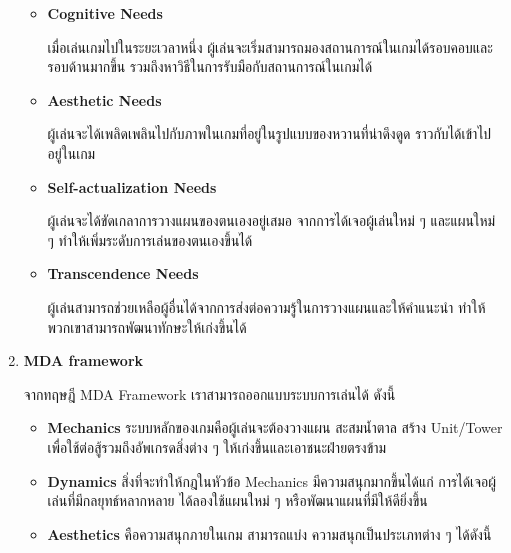 \documentclass[12pt,oneside,openright,a4paper]{cpe-thai-project}
\begin{document}
\begin{enumerate}
\begin{itemize}
    \item \textbf{Cognitive Needs} 
    
    เมื่อเล่นเกมไปในระยะเวลาหนึ่ง ผู้เล่นจะเริ่มสามารถมองสถานการณ์ในเกมได้รอบคอบและรอบด้านมากขึ้น รวมถึงหาวิธีในการรับมือกับสถานการณ์ในเกมได้
    
    \item \textbf{Aesthetic Needs} 
    
    ผู้เล่นจะได้เพลิดเพลินไปกับภาพในเกมที่อยู่ในรูปแบบของหวานที่น่าดึงดูด ราวกับได้เข้าไปอยู่ในเกม
    
    \item \textbf{Self-actualization Needs} 
    
    ผู้เล่นจะได้ขัดเกลาการวางแผนของตนเองอยู่เสมอ จากการได้เจอผู้เล่นใหม่ ๆ และแผนใหม่ ๆ ทำให้เพิ่มระดับการเล่นของตนเองขึ้นได้
    
    \item \textbf{Transcendence Needs} 
    
    ผู้เล่นสามารถช่วยเหลือผู้อื่นได้จากการส่งต่อความรู้ในการวางแผนและให้คำแนะนำ ทำให้พวกเขาสามารถพัฒนาทักษะให้เก่งขึ้นได้
  \end{itemize}


  \item \textbf{MDA framework}
  
  จากทฤษฎี MDA Framework เราสามารถออกแบบระบบการเล่นได้ ดังนี้

  \begin{itemize}
    \item \textbf{Mechanics} ระบบหลักของเกมคือผู้เล่นจะต้องวางแผน 
    สะสมน้ำตาล สร้าง Unit/Tower เพื่อใช้ต่อสู้รวมถึงอัพเกรดสิ่งต่าง ๆ 
    ให้เก่งขึ้นและเอาชนะฝ่ายตรงข้าม
    \item \textbf{Dynamics} สิ่งที่จะทำให้กฎในหัวข้อ Mechanics 
    มีความสนุกมากขึ้นได้แก่ การได้เจอผู้เล่นที่มีกลยุทธ์หลากหลาย ได้ลองใช้แผนใหม่ ๆ 
    หรือพัฒนาแผนที่มีให้ดียิ่งขึ้น
    \item \textbf{Aesthetics} คือความสนุกภายในเกม สามารถแบ่ง
    ความสนุกเป็นประเภทต่าง ๆ ได้ดังนี้


\end{itemize}
\end{enumerate}
\end{document}
